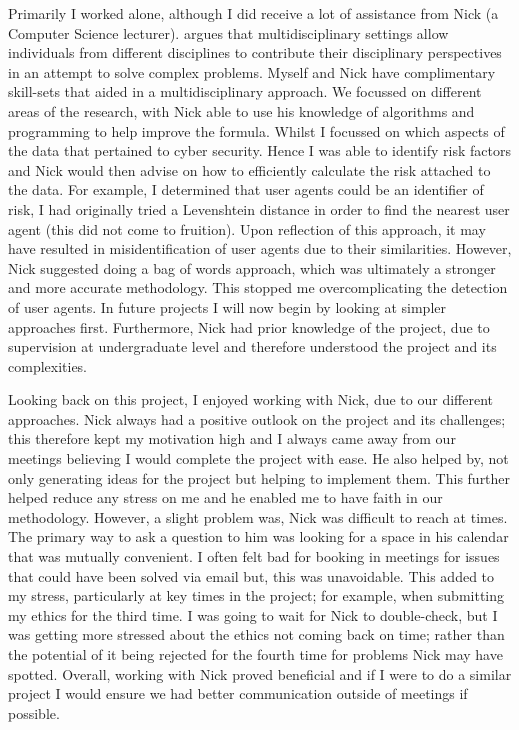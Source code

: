 Primarily I worked alone, although I did receive a lot of assistance from Nick (a Computer Science lecturer). \cite{thurow1999dynamics} argues that multidisciplinary settings allow individuals from different disciplines to contribute their disciplinary perspectives in an attempt to solve complex problems. Myself and Nick have complimentary skill-sets that aided in a multidisciplinary approach. We focussed on different areas of the research, with Nick able to use his knowledge of algorithms and programming to help improve the formula. Whilst I focussed on which aspects of the data that pertained to cyber security. Hence I was able to identify risk factors and Nick would then advise on how to efficiently calculate the risk attached to the data. For example, I determined that user agents could be an identifier of risk, I had originally tried a Levenshtein distance in order to find the nearest user agent (this did not come to fruition). Upon reflection of this approach, it may have resulted in misidentification of user agents due to their similarities. However, Nick suggested doing a bag of words approach, which was ultimately a stronger and more accurate methodology. This stopped me overcomplicating the detection of user agents. In future projects I will now begin by looking at simpler approaches first. Furthermore, Nick had prior knowledge of the project, due to supervision at undergraduate level and therefore understood the project and its complexities. 

Looking back on this project, I enjoyed working with Nick, due to our different approaches. Nick always had a positive outlook on the project and its challenges; this therefore kept my motivation high and I always came away from our meetings believing I would complete the project with ease. He also helped by, not only generating ideas for the project but helping to implement them. This further helped reduce any stress on me and he enabled me to have faith in our methodology. However, a slight problem was, Nick was difficult to reach at times. The primary way to ask a question to him was looking for a space in his calendar that was mutually convenient. I often felt bad for booking in meetings for issues that could have been solved via email but, this was unavoidable. This added to my stress, particularly at key times in the project; for example, when submitting my ethics for the third time. I was going to wait for Nick to double-check, but I was getting more stressed about the ethics not coming back on time; rather than the potential of it being rejected for the fourth time for problems Nick may have spotted. Overall, working with Nick proved beneficial and if I were to do a similar project I would ensure we had better communication outside of meetings if possible.

